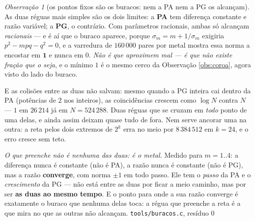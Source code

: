 \documentclass[11pt]{article}
\newcommand{\code}[1]{\texttt{\small #1}}
\theoremstyle{plain}
\theoremstyle{remark}
\newtheorem{obs}{Observação}
\begin{document}
\begin{obs}[os pontos fixos são os buracos: nem a PA nem a PG os alcançam]\label{obs:buracos}
As duas réguas mais simples são os dois limites: a \textbf{PA} tem diferença constante e razão
variável; a \textbf{PG}, o contrário. Com parâmetros racionais, ambas só alcançam \emph{racionais}
--- e é aí que o buraco aparece, porque $\sigma_m=m+1/\sigma_m$ exigiria $p^2-mpq-q^2=0$, e a
varredura de $160\,000$ pares por metal mostra essa norma a encostar em $\mathbf{1}$ e nunca em
$0$. \emph{Não é que aproximem mal --- é que não existe fração que o seja}, e o mínimo $1$ é o mesmo
cerco da Observação \ref{obs:coroa}, agora visto do lado do buraco.

E as colisões entre as duas não salvam: mesmo quando a PG inteira cai dentro da PA (potências de
$2$ nos inteiros), as coincidências crescem como $\log N$ contra $N$ --- $1$ em $26\,214$ já em
$N=524\,288$. Duas réguas que se cruzam em \emph{todo} ponto de uma delas, e ainda assim deixam
quase tudo de fora. Nem serve ancorar uma na outra: a reta pelos dois extremos de $2^k$ erra no meio
por $8\,384\,512$ em $k=24$, e o erro cresce sem teto.

\emph{O que preenche não é nenhuma das duas: é o metal.} Medido para $m=1..4$: a diferença nunca é
constante (não é PA), a razão nunca é constante (não é PG), mas a razão \textbf{converge}, com norma
$\pm1$ em todo passo. Ele tem o \emph{passo} da PA e o \emph{crescimento} da PG --- não está entre
as duas por ficar a meio caminho, mas por ser \textbf{as duas ao mesmo tempo}. E o ponto para onde
a sua razão converge é exatamente o buraco que nenhuma delas toca: a régua que preenche a reta é a
que mira no que as outras não alcançam.
\hfill{\small\code{tools/buracos.c}, resíduo $0$}
\end{obs}
\end{document}
